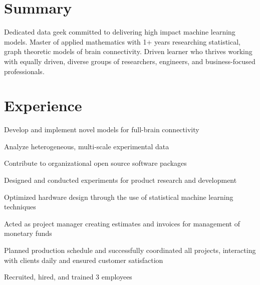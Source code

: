 \documentclass[]{deedy-resume-openfont}
\begin{document}
\hfill
\begin{minipage}[t]{0.63\textwidth}

\section{Summary}
Dedicated data geek committed to delivering high impact machine learning models.
Master of applied mathematics with 1+ years researching statistical, graph theoretic
models of brain connectivity. Driven learner who thrives working with equally
driven, diverse groups of researchers, engineers, and business-focused professionals.
\sectionsep




\section{Experience}
\vspace{\topsep}
\begin{tightemize}
\item {Develop and implement novel models for full-brain connectivity}
\item {Analyze heterogeneous, multi-scale experimental data}
\item {Contribute to organizational open source software packages}
\end{tightemize}
\sectionsep

\begin{tightemize}
\item {Designed and conducted experiments for product research and development}
\item {Optimized hardware design through the use of statistical machine learning techniques}
\end{tightemize}
\sectionsep

\begin{tightemize}
\item {Acted as project manager creating estimates and invoices for management of monetary funds}
\item {Planned production schedule and successfully coordinated all projects, interacting with clients daily and ensured customer satisfaction}
\item {Recruited, hired, and trained 3 employees}
\end{tightemize}
\sectionsep


\end{minipage}
\end{document}
